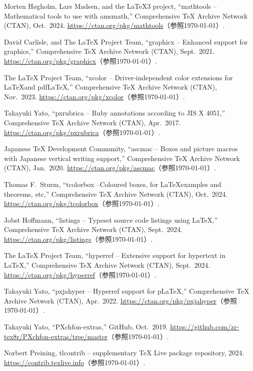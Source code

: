 \begin{thebibliography}{99}
 Morten Høgholm, Lars Madsen, and the {\LaTeX}3 project, ``mathtools -- Mathematical tools to use with amsmath,'' Comprehensive {\TeX} Archive Network (CTAN), Oct.\ 2024.
\url{https://ctan.org/pkg/mathtools}（参照\today）.

 David Carlisle, and The {\LaTeX} Project Team, ``graphicx -- Enhanced support for graphics,'' Comprehensive {\TeX} Archive Network (CTAN), Sept.\ 2021.
\url{https://ctan.org/pkg/graphicx}（参照\today）.

The {\LaTeX} Project Team, ``xcolor -- Driver-independent color extensions for \LaTeX and pdf{\LaTeX},'' Comprehensive {\TeX} Archive Network (CTAN), Nov.\ 2023.
\url{https://ctan.org/pkg/xcolor}（参照\today）.

Takayuki Yato, ``pxrubrica -- Ruby annotations according to JIS X 4051,'' Comprehensive {\TeX} Archive Network (CTAN), Apr.\ 2017.
\url{https://ctan.org/pkg/pxrubrica}（参照\today）.

Japanese {\TeX} Development Community, ``ascmac -- Boxes and picture macros with Japanese vertical writing support,'' Comprehensive {\TeX} Archive Network (CTAN), Jan.\ 2020.
\url{https://ctan.org/pkg/ascmac}（参照\today）.

Thomas F.\ Sturm, ``tcolorbox --Coloured boxes, for \LaTeX examples and theorems, etc,'' Comprehensive {\TeX} Archive Network (CTAN), Oct.\ 2024.
\url{https://ctan.org/pkg/tcolorbox}（参照\today）.

Jobst Hoffmann, ``listings -- Typeset source code listings using {\LaTeX},'' Comprehensive {\TeX} Archive Network (CTAN), Sept.\ 2024.
\url{https://ctan.org/pkg/listings}（参照\today）.

The {\LaTeX} Project Team, ``hyperref -- Extensive support for hypertext in {\LaTeX},'' Comprehensive {\TeX} Archive Network (CTAN), Sept.\ 2024.
\url{https://ctan.org/pkg/hyperref}（参照\today）.

Takayuki Yato, ``pxjahyper -- Hyperref support for p{\LaTeX},'' Comprehensive {\TeX} Archive Network (CTAN), Apr.\ 2022.
\url{https://ctan.org/pkg/pxjahyper}（参照\today）.

 Takayuki Yato, ``PXchfon-extras,'' GitHub, Oct.\ 2019.
\url{https://github.com/zr-tex8r/PXchfon-extras/tree/master}（参照\today）.

Norbert Preining, tlcontrib -- supplementary TeX Live package repository, 2024. 
\url{https://contrib.texlive.info}（参照\today）.
\end{thebibliography}